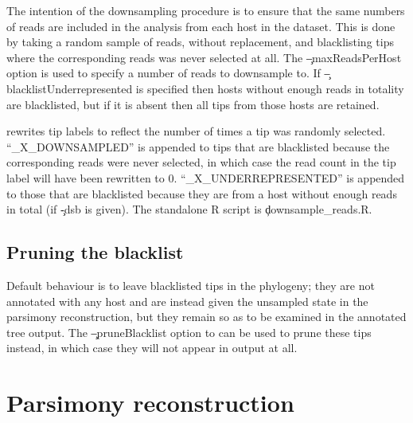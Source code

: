 The intention of the downsampling procedure is to ensure that the same numbers of reads are included in the analysis from each host in the dataset.
This is done by taking a random sample of reads, without replacement, and blacklisting tips where the corresponding reads was never selected at all.
 The \c{--maxReadsPerHost} option is used to specify a number of reads to downsample to.
If \c{--blacklistUnderrepresented} is specified then hosts without enough reads in totality are blacklisted, but if it is absent then all tips from those hosts are retained.

\pat rewrites tip labels to reflect the number of times a tip was randomly selected.
``\_X\_DOWNSAMPLED'' is appended to tips that are blacklisted because the corresponding reads were never selected, in which case the read count in the tip label will have been rewritten to 0.
``\_X\_UNDERREPRESENTED'' is appended to those that are blacklisted because they are from a host without enough reads in total (if \c{-dsb} is given).
The standalone R script is \c{downsample\_reads.R}.

\subsection{Pruning the blacklist}

Default behaviour is to leave blacklisted tips in the phylogeny; they are not annotated with any host and are instead given the unsampled state in the parsimony reconstruction, but they remain so as to be examined in the annotated tree output.
The \c{--pruneBlacklist} option to \pat can be used to prune these tips instead, in which case they will not appear in output at all.

\section{Parsimony reconstruction} \label{sec:ParsimonyReconstruction}

